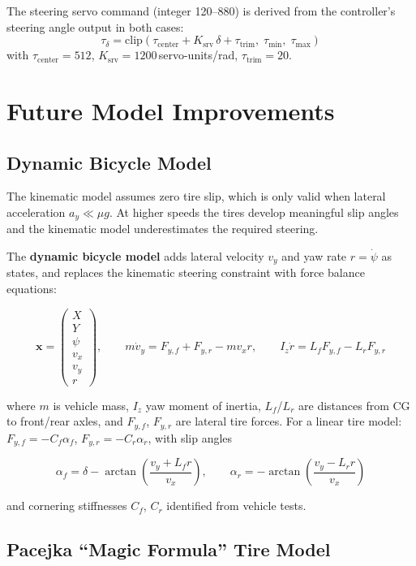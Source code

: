 \documentclass[11pt]{article}
\begin{document}
\medskip

The steering servo command (integer 120--880) is derived from the controller's
steering angle output in both cases:
\[
\tau_{\delta} = \mathrm{clip}\!\left(\tau_{\text{center}} + K_{\text{srv}}\,\delta + \tau_{\text{trim}},\;
  \tau_{\min},\; \tau_{\max}\right)
\]
with $\tau_{\text{center}} = 512$, $K_{\text{srv}} = 1200$\,servo-units/rad,
$\tau_{\text{trim}} = 20$.


\section{Future Model Improvements}

\subsection{Dynamic Bicycle Model}

The kinematic model assumes zero tire slip, which is only valid when lateral
acceleration $a_y \ll \mu g$.  At higher speeds the tires develop meaningful
slip angles and the kinematic model underestimates the required steering.

The \textbf{dynamic bicycle model} adds lateral velocity $v_y$ and yaw rate
$r = \dot{\psi}$ as states, and replaces the kinematic steering constraint with
force balance equations:

\[
\bm{x} = \begin{pmatrix} X \\ Y \\ \psi \\ v_x \\ v_y \\ r \end{pmatrix},
\qquad
m\dot{v}_y = F_{y,f} + F_{y,r} - m v_x r, \qquad
I_z\dot{r} = L_f F_{y,f} - L_r F_{y,r}
\]

where $m$ is vehicle mass, $I_z$ yaw moment of inertia, $L_f$/$L_r$ are
distances from CG to front/rear axles, and $F_{y,f}$, $F_{y,r}$ are lateral
tire forces.  For a linear tire model: $F_{y,f} = -C_f\alpha_f$,
$F_{y,r} = -C_r\alpha_r$, with slip angles

\[
\alpha_f = \delta - \arctan\!\left(\frac{v_y + L_f r}{v_x}\right), \qquad
\alpha_r = -\arctan\!\left(\frac{v_y - L_r r}{v_x}\right)
\]

and cornering stiffnesses $C_f$, $C_r$ identified from vehicle tests.

\subsection{Pacejka ``Magic Formula'' Tire Model}
\end{document}
